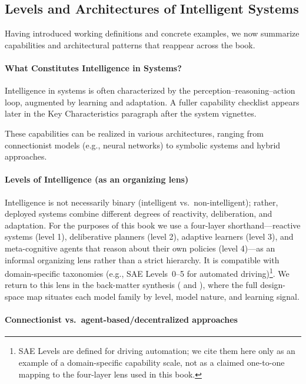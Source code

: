 \subsection{Levels and Architectures of Intelligent Systems}
\label{sec:intro_levels_and_architectures_of_intelligent_systems}

Having introduced working definitions and concrete examples, we now summarize capabilities and architectural patterns that reappear across the book.

\paragraph{What Constitutes Intelligence in Systems?}

Intelligence in systems is often characterized by the perception--reasoning--action loop, augmented by learning and adaptation. A fuller capability checklist appears later in the Key Characteristics paragraph after the system vignettes.

These capabilities can be realized in various architectures, ranging from connectionist models (e.g., neural networks) to symbolic systems and hybrid approaches.

\paragraph{Levels of Intelligence (as an organizing lens)}

Intelligence is not necessarily binary (intelligent vs.\ non-intelligent); rather, deployed systems combine different degrees of reactivity, deliberation, and adaptation. For the purposes of this book we use a four-layer shorthand---reactive systems (level 1), deliberative planners (level 2), adaptive learners (level 3), and meta-cognitive agents that reason about their own policies (level 4)---as an informal organizing lens rather than a strict hierarchy. It is compatible with domain-specific taxonomies (e.g., SAE Levels~0--5 for automated driving)\footnote{SAE Levels are defined for driving automation; we cite them here only as an example of a domain-specific capability scale, not as a claimed one-to-one mapping to the four-layer lens used in this book.}. We return to this lens in the back-matter synthesis ( and ), where the full design-space map situates each model family by level, model nature, and learning signal.

\paragraph{Connectionist vs.\ agent-based/decentralized approaches}

